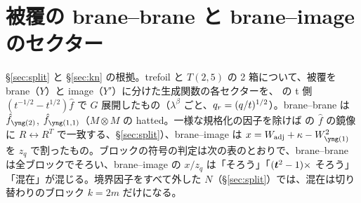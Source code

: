 \section{被覆の brane--brane と brane--image のセクター}\label{app:cover}
§\ref{sec:split} と §\ref{sec:kn} の根拠。trefoil と $T(2,5)$ の 2 箱について、被覆を brane（$Y$）と image（$Y'$）に分けた生成関数の各セクターを、\cite{KN17} の t 側 $(t^{-1/2} - t^{1/2})\hat f$ で $G$ 展開したもの（$\lambda^\beta$ ごと、$q_r = (q/t)^{1/2}$）。brane--brane は $\hat f_{\ytwo}$, $\hat f_{\yoneone}$（$M \otimes M$ の hatted。一様な規格化の因子を除けば \cite{KN17} の $\hat f$ の鏡像に $R \leftrightarrow R^T$ で一致する、§\ref{sec:split}）、brane--image は $x = W_{\mathrm{adj}} + \kappa - W_{\yone}^2$ を $z_q$ で割ったもの。ブロックの符号の判定は次の表のとおりで、brane--brane は全ブロックでそろい、brane--image の $x/z_q$ は「そろう」「$(\bm{t}^2 - 1)\times$ そろう」「混在」が混じる。境界因子をすべて外した $N$（§\ref{sec:split}）では、混在は切り替わりのブロック $k = 2m$ だけになる。



